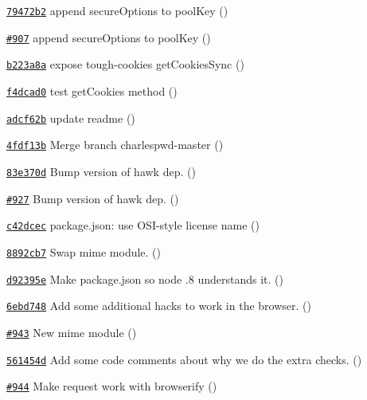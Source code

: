 \begin{DoxyItemize}
\item \href{https://github.com/mikeal/request/commit/79472b263cde77504a354913a16bdc9fbdc9ed5d}{\tt 79472b2} append secure\+Options to pool\+Key ()
\item \href{https://github.com/mikeal/request/pull/907}{\tt \#907} append secure\+Options to pool\+Key ()
\item \href{https://github.com/mikeal/request/commit/b223a8add0cbdd4e699a52da66aeb0f0cb17a0c3}{\tt b223a8a} expose tough-\/cookie\textquotesingle{}s get\+Cookies\+Sync ()
\item \href{https://github.com/mikeal/request/commit/f4dcad0fa6e2f2388abae508ad7256a1e1214ab2}{\tt f4dcad0} test get\+Cookies method ()
\item \href{https://github.com/mikeal/request/commit/adcf62bf45ec19a28198ca8d3f37e7d7babc883a}{\tt adcf62b} update readme ()
\item \href{https://github.com/mikeal/request/commit/4fdf13b57dcd20b9fe03c0956f5df70c82d6e4a3}{\tt 4fdf13b} Merge branch \textquotesingle{}charlespwd-\/master\textquotesingle{} ()
\item \href{https://github.com/mikeal/request/commit/83e370d54ca2a5fb162e40e7e705e1e9d702ba0a}{\tt 83e370d} Bump version of hawk dep. ()
\item \href{https://github.com/mikeal/request/pull/927}{\tt \#927} Bump version of hawk dep. ()
\item \href{https://github.com/mikeal/request/commit/c42dcec10a307cb2299861f87720d491a89142b4}{\tt c42dcec} package.\+json\+: use O\+S\+I-\/style license name ()
\item \href{https://github.com/mikeal/request/commit/8892cb7bb8945807ff25038e888222d4e902acc8}{\tt 8892cb7} Swap mime module. ()
\item \href{https://github.com/mikeal/request/commit/d92395e638cbfe5c31eb4ff54941b98b09057486}{\tt d92395e} Make package.\+json so node .8 understands it. ()
\item \href{https://github.com/mikeal/request/commit/6ebd748a02a49976d41ebbc4f8396acf8fda1c14}{\tt 6ebd748} Add some additional hacks to work in the browser. ()
\item \href{https://github.com/mikeal/request/pull/943}{\tt \#943} New mime module ()
\item \href{https://github.com/mikeal/request/commit/561454d18a68b7a03163308f6d29e127afe97426}{\tt 561454d} Add some code comments about why we do the extra checks. ()
\item \href{https://github.com/mikeal/request/pull/944}{\tt \#944} Make request work with browserify ()

\end{DoxyItemize}
